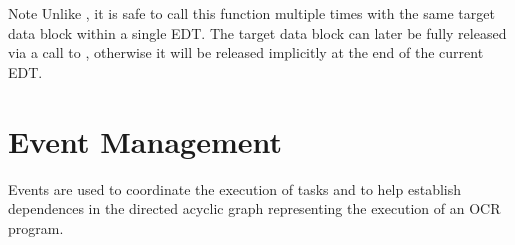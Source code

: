 \begin{DoxyNote}{Note}
Unlike \hyperlink{func_ocrDbRelease}{},
it is safe to call this function multiple times with the same target data block
within a single EDT. The target data block can later be fully released via
a call to \hyperlink{func_ocrDbRelease}{},
otherwise it will be released implicitly at the end of the current EDT.
\end{DoxyNote}

\section{Event Management}
\label{sec:OCREventManagement}

Events are used to coordinate the execution of tasks and to
help establish dependences in the directed acyclic graph representing the
execution of an OCR program.

